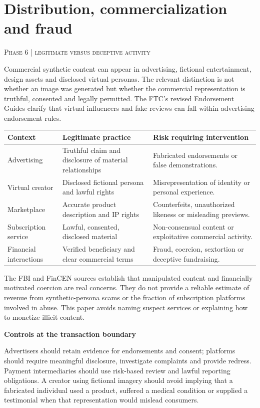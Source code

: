 \documentclass[10pt,a4paper]{article}
\newcommand{\sect}[2]{\Needspace{6\baselineskip}\section{#1}\textcolor{muted}{\small\textsc{#2}}\par\vspace{2mm}}
\newcommand{\sub}[1]{\vspace{1mm}\textbf{#1}\par}
\begin{document}
\sect{Distribution, commercialization and fraud}{Phase 6 | legitimate versus deceptive activity}

Commercial synthetic content can appear in advertising, fictional entertainment, design assets and disclosed virtual personas. The relevant distinction is not whether an image was generated but whether the commercial representation is truthful, consented and legally permitted. The FTC's revised Endorsement Guides clarify that virtual influencers and fake reviews can fall within advertising endorsement rules. \cite{ftcads}


\begin{center}\small\begin{tabularx}{\linewidth}{@{}YYY@{}}\toprule
\textbf{Context} & \textbf{Legitimate practice} & \textbf{Risk requiring intervention}\\\midrule
Advertising & Truthful claim and disclosure of material relationships & Fabricated endorsements or false demonstrations.\\
Virtual creator & Disclosed fictional persona and lawful rights & Misrepresentation of identity or personal experience.\\
Marketplace & Accurate product description and IP rights & Counterfeits, unauthorized likeness or misleading previews.\\
Subscription service & Lawful, consented, disclosed material & Non-consensual content or exploitative commercial activity.\\
Financial interactions & Verified beneficiary and clear commercial terms & Fraud, coercion, sextortion or deceptive fundraising.\\\bottomrule\end{tabularx}\end{center}

The FBI and FinCEN sources establish that manipulated content and financially motivated coercion are real concerns. They do not provide a reliable estimate of revenue from synthetic-persona scams or the fraction of subscription platforms involved in abuse. This paper avoids naming suspect services or explaining how to monetize illicit content. \cite{fbi,fincen}


\sub{Controls at the transaction boundary}

Advertisers should retain evidence for endorsements and consent; platforms should require meaningful disclosure, investigate complaints and provide redress. Payment intermediaries should use risk-based review and lawful reporting obligations. A creator using fictional imagery should avoid implying that a fabricated individual used a product, suffered a medical condition or supplied a testimonial when that representation would mislead consumers.
\end{document}
